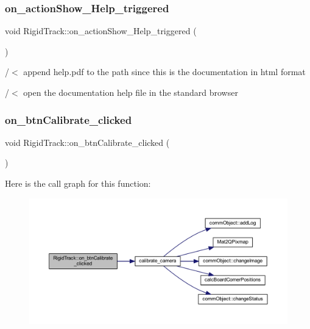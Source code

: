 \subsubsection{\texorpdfstring{on\+\_\+action\+Show\+\_\+\+Help\+\_\+triggered}{on\_actionShow\_Help\_triggered}}
{\footnotesize\ttfamily void Rigid\+Track\+::on\+\_\+action\+Show\+\_\+\+Help\+\_\+triggered (\begin{DoxyParamCaption}{ }\end{DoxyParamCaption})\hspace{0.3cm}{\ttfamily [slot]}}

/$<$ append help.\+pdf to the path since this is the documentation in html format

/$<$ open the documentation help file in the standard browser \mbox{\label{class_rigid_track_aed2c39da404909142074f7dd2ce75a63}} 
\subsubsection{\texorpdfstring{on\+\_\+btn\+Calibrate\+\_\+clicked}{on\_btnCalibrate\_clicked}}
{\footnotesize\ttfamily void Rigid\+Track\+::on\+\_\+btn\+Calibrate\+\_\+clicked (\begin{DoxyParamCaption}{ }\end{DoxyParamCaption})\hspace{0.3cm}{\ttfamily [slot]}}

Here is the call graph for this function\+:\nopagebreak
\begin{figure}[H]
\begin{center}
\leavevmode
\includegraphics[width=350pt]{class_rigid_track_aed2c39da404909142074f7dd2ce75a63_cgraph}
\end{center}
\end{figure}
\mbox{\label{class_rigid_track_a9a939d6db3d268e75a603cb3d492a91b}} 
